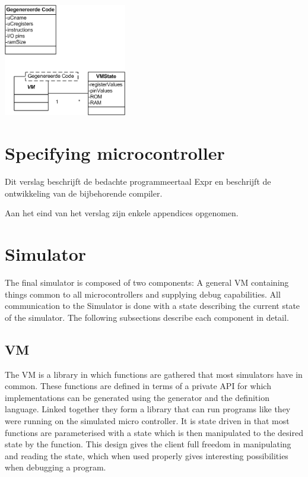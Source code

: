 \documentclass[a4paper]{report}
\begin{document}
\begin{center}
\includegraphics[width=5.376cm,height=4.932cm]{Essig-img002.png}
\end{center}
\clearpage\chapter{Specifying microcontroller}
Dit verslag beschrijft de bedachte programmeertaal Expr en beschrijft de
ontwikkeling van de bijbehorende compiler.

Aan het eind van het verslag zijn enkele appendices opgenomen. 

\clearpage\chapter{Simulator}
The final simulator is composed of two components: A general VM
containing things common to all microcontrollers and supplying debug
capabilities. All communication to the Simulator is done with a state
describing the current state of the simulator. The following
subsections describe each component in detail.

\section{VM}

The VM is a library in which functions are gathered that most simulators
have in common. These functions are defined in terms of a private API
for which implementations can be generated using the generator and the
definition language. Linked together they form a library that can run
programs like they were running on the simulated micro controller. It
is state driven in that most functions are parameterised with a state
which is then manipulated to the desired state by the function. This
design gives the client full freedom in manipulating and reading the
state, which when used properly gives interesting possibilities when
debugging a program.
\end{document}
